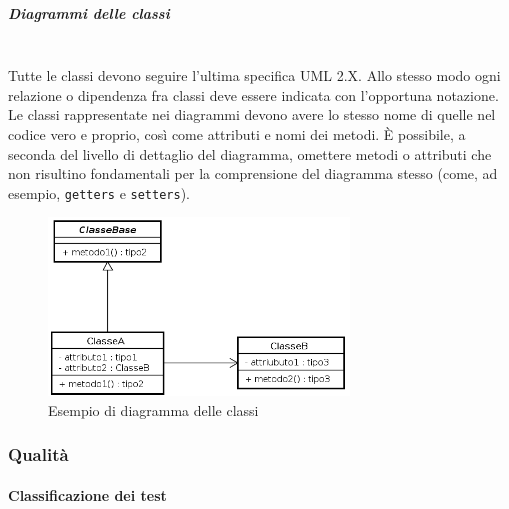 \subparagraph{Diagrammi delle classi}\mbox{}\\
Tutte le classi devono seguire l'ultima specifica UML 2.X. Allo stesso modo ogni relazione o dipendenza fra classi deve essere indicata con l'opportuna notazione.
Le classi rappresentate nei diagrammi devono avere lo stesso nome di quelle nel codice vero e proprio, così come attributi e nomi dei metodi. È possibile, a seconda del livello di dettaglio del diagramma, omettere metodi o attributi che non risultino fondamentali per la comprensione del diagramma stesso (come, ad esempio, \texttt{getters} e \texttt{setters}).
\begin{figure}[H]
		\centering
		\includegraphics[width=8cm,keepaspectratio]{img/DiagrammaClassi.png}
		\caption{Esempio di diagramma delle classi}
	\end{figure}




\subsubsection{Qualità}

\paragraph{Classificazione dei test}\mbox{}\\

